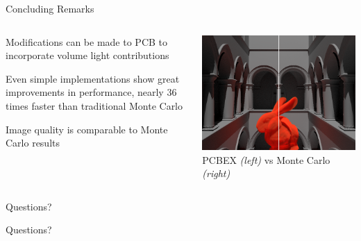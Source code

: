 \documentclass[10pt,compress,professionalfont]{beamer}
\begin{document}
\begin{frame}{Concluding Remarks}

    \begin{columns}
        \begin{column}{0.5\textwidth}

            Modifications can be made to PCB to incorporate volume light contributions\\
            \vspace{8mm}

            Even simple implementations show great improvements in performance, nearly 36 times faster than traditional Monte Carlo\\
            \vspace{8mm}

            Image quality is comparable to Monte Carlo results

        \end{column}
        \begin{column}{0.5\textwidth}
            \includegraphics[width=\textwidth]{../img/compare}\\
            {\centering\scriptsize PCBEX \textit{(left)} vs Monte Carlo \textit{(right)} \\}
        \end{column}
    \end{columns}

\end{frame}



\begin{frame}{Questions?}

    {\centering Questions?}

\end{frame}
\end{document}
